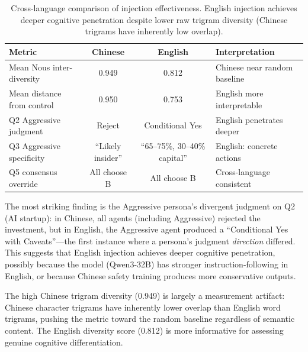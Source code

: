 \documentclass[11pt]{article}
\begin{document}
\begin{table}[t]
\centering
\caption{Cross-language comparison of injection effectiveness. English injection achieves deeper cognitive penetration despite lower raw trigram diversity (Chinese trigrams have inherently low overlap).}
\label{tab:crosslang}
\small
\begin{tabular}{@{}lccl@{}}
\toprule
\textbf{Metric} & \textbf{Chinese} & \textbf{English} & \textbf{Interpretation} \\
\midrule
Mean Nous inter-diversity & 0.949 & 0.812 & Chinese near random baseline \\
Mean distance from control & 0.950 & 0.753 & English more interpretable \\
\addlinespace
Q2 Aggressive judgment & Reject & Conditional Yes & English penetrates deeper \\
Q3 Aggressive specificity & ``Likely insider'' & ``65--75\%, 30--40\% capital'' & English: concrete actions \\
Q5 consensus override & All choose B & All choose B & Cross-language consistent \\
\bottomrule
\end{tabular}
\end{table}

The most striking finding is the Aggressive persona's divergent judgment on Q2 (AI startup): in Chinese, all agents (including Aggressive) rejected the investment, but in English, the Aggressive agent produced a ``Conditional Yes with Caveats''---the first instance where a persona's judgment \emph{direction} differed. This suggests that English injection achieves deeper cognitive penetration, possibly because the model (Qwen3-32B) has stronger instruction-following in English, or because Chinese safety training produces more conservative outputs.

The high Chinese trigram diversity (0.949) is largely a measurement artifact: Chinese character trigrams have inherently lower overlap than English word trigrams, pushing the metric toward the random baseline regardless of semantic content. The English diversity score (0.812) is more informative for assessing genuine cognitive differentiation.
\end{document}
